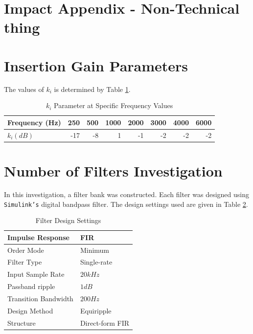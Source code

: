 \documentclass[11pt,onecolumn]{witseiepaper}
\begin{document}
\newpage
\printbibliography
\newpage
\begin{appendices}

\section{Impact Appendix - Non-Technical thing}
\label{app:nonTech}

\section{Insertion Gain Parameters}
\label{app:insertGainParam}

\noindent The values of $k_i$ is determined by Table \ref{tab:kiVal}.

\begin{table}[htbp]
  \centering
  \caption{$k_i$ Parameter at Specific Frequency Values}
    \begin{tabular}{|l|r|r|r|r|r|r|r|}
    \hline
    \textbf{Frequency (Hz)} & 250   & 500   & 1000  & 2000  & 3000  & 4000  & 6000 \\
    \hline
    \textbf{$k_i (dB)$} & -17   & -8    & 1     & -1    & -2    & -2    & -2 \\
    \hline
    \end{tabular}%
  \label{tab:kiVal}%
\end{table}%


\section{Number of Filters Investigation}
\label{app:numFilt}

\noindent In this investigation, a filter bank was constructed. Each filter was designed using \texttt{Simulink's} digital bandpass filter. The design settings used are given in Table \ref{tab:numFilt_FiltSpec}.

\begin{table}[htbp]
  \centering
  \caption{Filter Design Settings}
  
    \begin{tabular}{|l|l|}
    \hline
    Impulse Response  & FIR  \\
    \hline
    Order Mode & Minimum \\
    \hline
    Filter Type & Single-rate \\
    \hline
    Input Sample Rate & $20kHz$ \\
    \hline
    Passband ripple & $1dB$ \\
    \hline
    Transition Bandwidth & $200Hz$ \\
    \hline
    Design Method & Equiripple \\
    \hline
    Structure  & Direct-form FIR \\
    \hline
    \end{tabular}%
  \label{tab:numFilt_FiltSpec}%
\end{table}%


\end{appendices}
\end{document}
